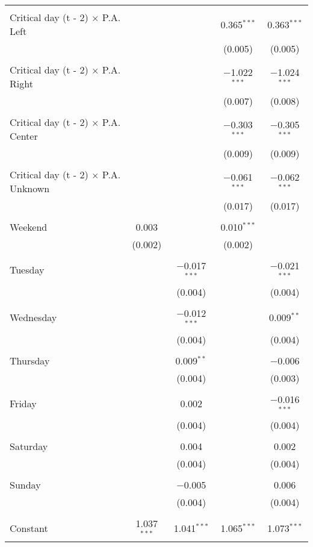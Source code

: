 \documentclass[
]{article}
\begin{document}
\begin{table}[!htbp]
{\begin{tabular}{@{\extracolsep{5pt}}lcccc}
  & & & & \\ 
 Critical day (t - 2) $\times$ P.A. Left &  &  & 0.365$^{***}$ & 0.363$^{***}$ \\ 
  &  &  & (0.005) & (0.005) \\ 
  & & & & \\ 
 Critical day (t - 2) $\times$ P.A. Right &  &  & $-$1.022$^{***}$ & $-$1.024$^{***}$ \\ 
  &  &  & (0.007) & (0.008) \\ 
  & & & & \\ 
 Critical day (t - 2) $\times$ P.A. Center &  &  & $-$0.303$^{***}$ & $-$0.305$^{***}$ \\ 
  &  &  & (0.009) & (0.009) \\ 
  & & & & \\ 
 Critical day (t - 2) $\times$ P.A. Unknown &  &  & $-$0.061$^{***}$ & $-$0.062$^{***}$ \\ 
  &  &  & (0.017) & (0.017) \\ 
  & & & & \\ 
 Weekend & 0.003 &  & 0.010$^{***}$ &  \\ 
  & (0.002) &  & (0.002) &  \\ 
  & & & & \\ 
 Tuesday &  & $-$0.017$^{***}$ &  & $-$0.021$^{***}$ \\ 
  &  & (0.004) &  & (0.004) \\ 
  & & & & \\ 
 Wednesday &  & $-$0.012$^{***}$ &  & 0.009$^{**}$ \\ 
  &  & (0.004) &  & (0.004) \\ 
  & & & & \\ 
 Thursday &  & 0.009$^{**}$ &  & $-$0.006 \\ 
  &  & (0.004) &  & (0.003) \\ 
  & & & & \\ 
 Friday &  & 0.002 &  & $-$0.016$^{***}$ \\ 
  &  & (0.004) &  & (0.004) \\ 
  & & & & \\ 
 Saturday &  & 0.004 &  & 0.002 \\ 
  &  & (0.004) &  & (0.004) \\ 
  & & & & \\ 
 Sunday &  & $-$0.005 &  & 0.006 \\ 
  &  & (0.004) &  & (0.004) \\ 
  & & & & \\ 
 Constant & 1.037$^{***}$ & 1.041$^{***}$ & 1.065$^{***}$ & 1.073$^{***}$ \\ 

\end{tabular}}
\end{table}
\end{document}
